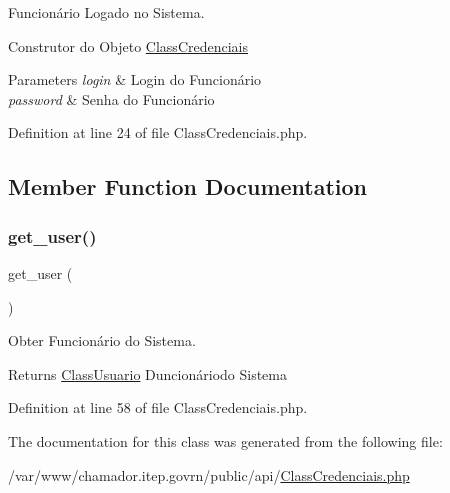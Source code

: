 Funcionário Logado no Sistema. 

Construtor do Objeto \hyperlink{class_class_credenciais}{Class\+Credenciais}


\begin{DoxyParams}{Parameters}
{\em login} & Login do Funcionário \\
\hline
{\em password} & Senha do Funcionário \\
\hline
\end{DoxyParams}


Definition at line 24 of file Class\+Credenciais.\+php.



\subsection{Member Function Documentation}
\mbox{\label{class_class_credenciais_af0d0313a713f6caa332e53471a6e92bb}} 
\subsubsection{\texorpdfstring{get\+\_\+user()}{get\_user()}}
{\footnotesize\ttfamily get\+\_\+user (\begin{DoxyParamCaption}{ }\end{DoxyParamCaption})}



Obter Funcionário do Sistema. 

\begin{DoxyReturn}{Returns}
\hyperlink{class_class_usuario}{Class\+Usuario} Duncionáriodo Sistema 
\end{DoxyReturn}


Definition at line 58 of file Class\+Credenciais.\+php.



The documentation for this class was generated from the following file\+:\begin{DoxyCompactItemize}
\item 
/var/www/chamador.\+itep.\+govrn/public/api/\hyperlink{_class_credenciais_8php}{Class\+Credenciais.\+php}\end{DoxyCompactItemize}
